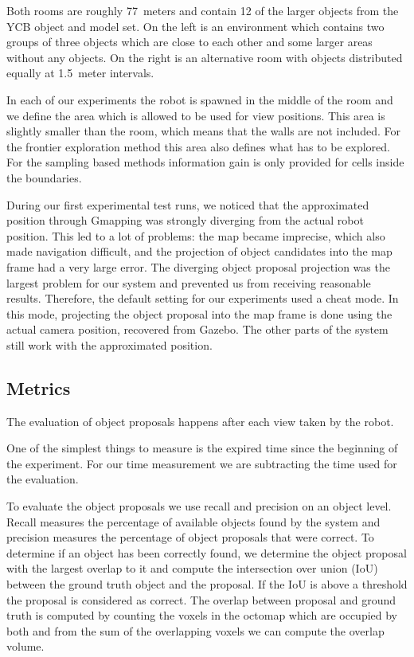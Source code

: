\documentclass[a4paper,11pt,english]{article}
\begin{document}
Both rooms are roughly \num{7}\texttimes\num{7}~meters and contain \num{12} of the larger objects from the YCB object and model set\cite{calli2015benchmarking}.
On the left is an environment which contains two groups of three objects which are close to each other and some larger areas without any objects.
On the right is an alternative room with objects distributed equally at \num{1.5}~meter intervals.

In each of our experiments the robot is spawned in the middle of the room and we define the area which is allowed to be used for view positions. This area is slightly smaller than the room, which means that the walls are not included.
For the frontier exploration method this area also defines what has to be explored.
For the sampling based methods information gain is only provided for cells inside the boundaries.

During our first experimental test runs, we noticed that the approximated position through Gmapping was strongly diverging from the actual robot position.
This led to a lot of problems: the map became imprecise, which also made navigation difficult, and the projection of object candidates into the map frame had a very large error.
The diverging object proposal projection was the largest problem for our system and prevented us from receiving reasonable results.
Therefore, the default setting for our experiments used a \glqq{}cheat mode\grqq{}.
In this mode, projecting the object proposal into the map frame is done using the actual camera position, recovered from Gazebo.
The other parts of the system still work with the approximated position.

\subsection{Metrics}
The evaluation of object proposals happens after each view taken by the robot.

One of the simplest things to measure is the expired time since the beginning of the experiment.
For our time measurement we are subtracting the time used for the evaluation.

To evaluate the object proposals we use recall and precision on an object level.
Recall measures the percentage of available objects found by the system and precision measures the percentage of object proposals that were correct.
To determine if an object has been correctly found, we determine the object proposal with the largest overlap to it and compute the intersection over union (IoU) between the ground truth object and the proposal.
If the IoU is above a threshold the proposal is considered as correct.
The overlap between proposal and ground truth is computed by counting the voxels in the octomap which are occupied by both and from the sum of the overlapping voxels we can compute the overlap volume.
\end{document}
